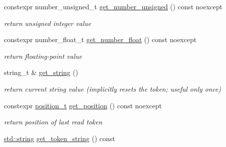 \begin{DoxyCompactItemize}
constexpr number\+\_\+unsigned\+\_\+t \hyperlink{classnlohmann_1_1detail_1_1lexer_a56640fb92293e0c17742ca3c814d74d6}{get\+\_\+number\+\_\+unsigned} () const noexcept
\begin{DoxyCompactList}\small\item\em return unsigned integer value \end{DoxyCompactList}\item 
\mbox{\label{classnlohmann_1_1detail_1_1lexer_ac013af35a21e9387993b19da5b3e0ae2}} 
constexpr number\+\_\+float\+\_\+t \hyperlink{classnlohmann_1_1detail_1_1lexer_ac013af35a21e9387993b19da5b3e0ae2}{get\+\_\+number\+\_\+float} () const noexcept
\begin{DoxyCompactList}\small\item\em return floating-\/point value \end{DoxyCompactList}\item 
\mbox{\label{classnlohmann_1_1detail_1_1lexer_a54aa290ff2f60218a8f35f1ebf81666d}} 
string\+\_\+t \& \hyperlink{classnlohmann_1_1detail_1_1lexer_a54aa290ff2f60218a8f35f1ebf81666d}{get\+\_\+string} ()
\begin{DoxyCompactList}\small\item\em return current string value (implicitly resets the token; useful only once) \end{DoxyCompactList}\item 
\mbox{\label{classnlohmann_1_1detail_1_1lexer_abf5143501435f9f79898c1ff238c2622}} 
constexpr \hyperlink{structnlohmann_1_1detail_1_1position__t}{position\+\_\+t} \hyperlink{classnlohmann_1_1detail_1_1lexer_abf5143501435f9f79898c1ff238c2622}{get\+\_\+position} () const noexcept
\begin{DoxyCompactList}\small\item\em return position of last read token \end{DoxyCompactList}\item 
\hyperlink{namespacenlohmann_1_1detail_a1ed8fc6239da25abcaf681d30ace4985ab45cffe084dd3d20d928bee85e7b0f21}{std\+::string} \hyperlink{classnlohmann_1_1detail_1_1lexer_a4aef7e72e539be04e139c34872421f2a}{get\+\_\+token\+\_\+string} () const
\item 
\mbox{\label{classnlohmann_1_1detail_1_1lexer_a53cebbc684ef97fa49651eb442d58f86}} 

\end{DoxyCompactItemize}
